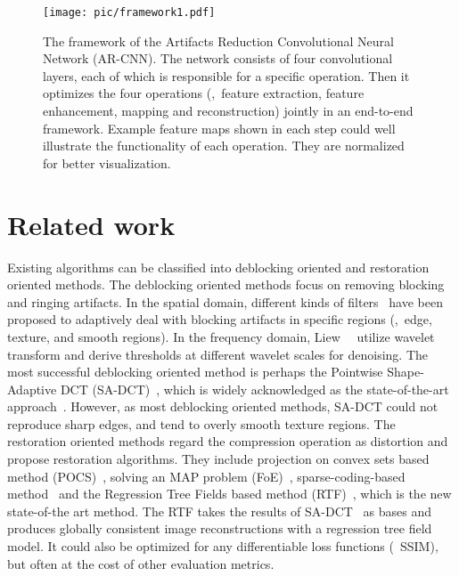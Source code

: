 \documentclass[10pt,twocolumn,letterpaper]{article}
\begin{document}
\begin{figure*}[t]\small
\begin{center}

 \texttt{[image: pic/framework1.pdf]}
\caption{The framework of the Artifacts Reduction Convolutional Neural Network (AR-CNN). The network consists of four convolutional layers, each of which is responsible for a specific operation. Then it optimizes the four operations (\ie,~feature extraction, feature enhancement, mapping and reconstruction) jointly in an end-to-end framework. Example feature maps shown in each step could well illustrate the functionality of each operation. They are normalized for better visualization.}
\label{fig:framework}
\vspace{-0.6cm}
\end{center}
\end{figure*}

\section{Related work}

Existing algorithms can be classified into deblocking oriented and restoration oriented methods.
The deblocking oriented methods focus on removing blocking and ringing artifacts.
In the spatial domain, different kinds of filters~\cite{List2003,ReeveIII1984,Wang2013} have been proposed to adaptively deal with blocking artifacts in specific regions (\eg,~edge, texture, and smooth regions). In the frequency domain, Liew~\etal~\cite{Liew2004} utilize wavelet transform and derive thresholds at different wavelet scales for denoising. The most successful deblocking oriented method is perhaps the Pointwise Shape-Adaptive DCT (SA-DCT)~\cite{Foi2007}, which is widely acknowledged as the state-of-the-art approach~\cite{Jancsary2012,Li2014}.
However, as most deblocking oriented methods, SA-DCT could not reproduce sharp edges, and tend to overly smooth texture regions.
The restoration oriented methods regard the compression operation as distortion and propose restoration algorithms. They include projection on convex sets based method (POCS)~\cite{Yang1995}, solving an MAP problem (FoE)~\cite{Sun2007}, sparse-coding-based method~\cite{Jung2012} and the Regression Tree Fields based method (RTF)~\cite{Jancsary2012}, which is the new state-of-the art method. The RTF takes the results of SA-DCT~\cite{Foi2007} as bases and produces globally consistent image reconstructions with a regression tree field model.
It could also be optimized for any differentiable loss functions (\eg~SSIM), but often at the cost of other evaluation metrics. 
\end{document}

